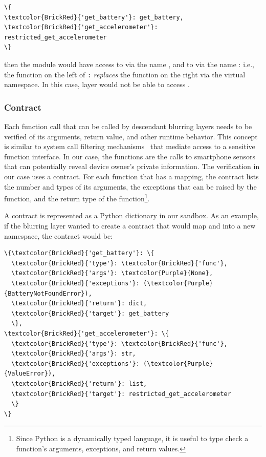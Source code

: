 \begin{Verbatim}
\{
\textcolor{BrickRed}{'get_battery'}: get_battery, 
\textcolor{BrickRed}{'get_accelerometer'}: restricted_get_accelerometer
\}
\end{Verbatim}
then the module  would have access
to  via the name , and to
 via the name 
: i.e., the function on the left of \texttt{:}
\textit{replaces} the function on the right via the virtual namespace. 
In this case, layer  would not be able to access 
.

\subsubsection{Contract}

%
Each function call that can be called by descendant blurring
layers needs to be verified of its arguments, return value, and 
other runtime behavior. This concept is similar to system call filtering
mechanisms~\cite{acharya2000mapbox, fraser2000hardening} 
that mediate access to a sensitive function interface. In our case, 
the functions are the calls to smartphone sensors that 
can potentially reveal device owner's private information. The 
verification in our case uses a contract. For each function that has a 
mapping, the contract lists the number 
and types of its arguments, the exceptions that can be raised 
by the function, and the return type of the function\footnote{\scriptsize 
Since Python is a dynamically typed language, it is useful to type check 
a function's arguments, exceptions, and return values.}.

A contract is represented as a Python dictionary in our sandbox. As an example, if 
the blurring layer  wanted to create a contract that would map
 and  into 
a new namespace, the contract would be: 

\begin{Verbatim}
\{\textcolor{BrickRed}{'get_battery'}: \{
  \textcolor{BrickRed}{'type'}: \textcolor{BrickRed}{'func'},
  \textcolor{BrickRed}{'args'}: \textcolor{Purple}{None}, 
  \textcolor{BrickRed}{'exceptions'}: (\textcolor{Purple}{BatteryNotFoundError}), 
  \textcolor{BrickRed}{'return'}: dict,
  \textcolor{BrickRed}{'target'}: get_battery
  \}, 
\textcolor{BrickRed}{'get_accelerometer'}: \{
  \textcolor{BrickRed}{'type'}: \textcolor{BrickRed}{'func'},
  \textcolor{BrickRed}{'args'}: str, 
  \textcolor{BrickRed}{'exceptions'}: (\textcolor{Purple}{ValueError}), 
  \textcolor{BrickRed}{'return'}: list,
  \textcolor{BrickRed}{'target'}: restricted_get_accelerometer
  \}
\}
\end{Verbatim} 


